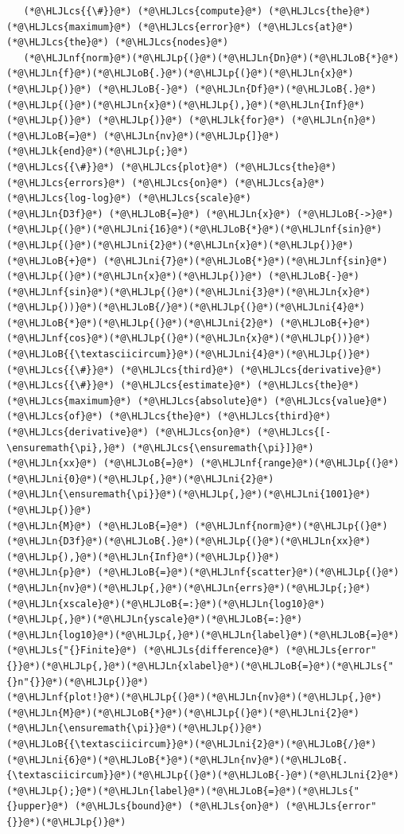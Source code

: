 \documentclass[12pt,a4paper]{article}
\newcommand{\HLJLk}[1]{\textcolor[RGB]{148,91,176}{\textbf{#1}}}
\newcommand{\HLJLn}[1]{#1}
\newcommand{\HLJLnf}[1]{\textcolor[RGB]{66,102,213}{#1}}
\newcommand{\HLJLs}[1]{\textcolor[RGB]{201,61,57}{#1}}
\newcommand{\HLJLni}[1]{\textcolor[RGB]{59,151,46}{#1}}
\newcommand{\HLJLoB}[1]{\textcolor[RGB]{102,102,102}{\textbf{#1}}}
\newcommand{\HLJLp}[1]{#1}
\newcommand{\HLJLcs}[1]{\textcolor[RGB]{153,153,119}{\textit{#1}}}
\begin{document}
\begin{lstlisting}
   (*@\HLJLcs{{\#}}@*) (*@\HLJLcs{compute}@*) (*@\HLJLcs{the}@*) (*@\HLJLcs{maximum}@*) (*@\HLJLcs{error}@*) (*@\HLJLcs{at}@*) (*@\HLJLcs{the}@*) (*@\HLJLcs{nodes}@*)
   (*@\HLJLnf{norm}@*)(*@\HLJLp{(}@*)(*@\HLJLn{Dn}@*)(*@\HLJLoB{*}@*)(*@\HLJLn{f}@*)(*@\HLJLoB{.}@*)(*@\HLJLp{(}@*)(*@\HLJLn{x}@*)(*@\HLJLp{)}@*) (*@\HLJLoB{-}@*) (*@\HLJLn{Df}@*)(*@\HLJLoB{.}@*)(*@\HLJLp{(}@*)(*@\HLJLn{x}@*)(*@\HLJLp{),}@*)(*@\HLJLn{Inf}@*)(*@\HLJLp{)}@*) (*@\HLJLp{)}@*) (*@\HLJLk{for}@*) (*@\HLJLn{n}@*) (*@\HLJLoB{=}@*) (*@\HLJLn{nv}@*)(*@\HLJLp{]}@*)
(*@\HLJLk{end}@*)(*@\HLJLp{;}@*)
(*@\HLJLcs{{\#}}@*) (*@\HLJLcs{plot}@*) (*@\HLJLcs{the}@*) (*@\HLJLcs{errors}@*) (*@\HLJLcs{on}@*) (*@\HLJLcs{a}@*) (*@\HLJLcs{log-log}@*) (*@\HLJLcs{scale}@*)
(*@\HLJLn{D3f}@*) (*@\HLJLoB{=}@*) (*@\HLJLn{x}@*) (*@\HLJLoB{->}@*) (*@\HLJLp{(}@*)(*@\HLJLni{16}@*)(*@\HLJLoB{*}@*)(*@\HLJLnf{sin}@*)(*@\HLJLp{(}@*)(*@\HLJLni{2}@*)(*@\HLJLn{x}@*)(*@\HLJLp{)}@*) (*@\HLJLoB{+}@*) (*@\HLJLni{7}@*)(*@\HLJLoB{*}@*)(*@\HLJLnf{sin}@*)(*@\HLJLp{(}@*)(*@\HLJLn{x}@*)(*@\HLJLp{)}@*) (*@\HLJLoB{-}@*) (*@\HLJLnf{sin}@*)(*@\HLJLp{(}@*)(*@\HLJLni{3}@*)(*@\HLJLn{x}@*)(*@\HLJLp{))}@*)(*@\HLJLoB{/}@*)(*@\HLJLp{(}@*)(*@\HLJLni{4}@*)(*@\HLJLoB{*}@*)(*@\HLJLp{(}@*)(*@\HLJLni{2}@*) (*@\HLJLoB{+}@*) (*@\HLJLnf{cos}@*)(*@\HLJLp{(}@*)(*@\HLJLn{x}@*)(*@\HLJLp{))}@*)(*@\HLJLoB{{\textasciicircum}}@*)(*@\HLJLni{4}@*)(*@\HLJLp{)}@*) (*@\HLJLcs{{\#}}@*) (*@\HLJLcs{third}@*) (*@\HLJLcs{derivative}@*)
(*@\HLJLcs{{\#}}@*) (*@\HLJLcs{estimate}@*) (*@\HLJLcs{the}@*) (*@\HLJLcs{maximum}@*) (*@\HLJLcs{absolute}@*) (*@\HLJLcs{value}@*) (*@\HLJLcs{of}@*) (*@\HLJLcs{the}@*) (*@\HLJLcs{third}@*) (*@\HLJLcs{derivative}@*) (*@\HLJLcs{on}@*) (*@\HLJLcs{[-\ensuremath{\pi},}@*) (*@\HLJLcs{\ensuremath{\pi}]}@*)
(*@\HLJLn{xx}@*) (*@\HLJLoB{=}@*) (*@\HLJLnf{range}@*)(*@\HLJLp{(}@*)(*@\HLJLni{0}@*)(*@\HLJLp{,}@*)(*@\HLJLni{2}@*)(*@\HLJLn{\ensuremath{\pi}}@*)(*@\HLJLp{,}@*)(*@\HLJLni{1001}@*)(*@\HLJLp{)}@*)
(*@\HLJLn{M}@*) (*@\HLJLoB{=}@*) (*@\HLJLnf{norm}@*)(*@\HLJLp{(}@*)(*@\HLJLn{D3f}@*)(*@\HLJLoB{.}@*)(*@\HLJLp{(}@*)(*@\HLJLn{xx}@*)(*@\HLJLp{),}@*)(*@\HLJLn{Inf}@*)(*@\HLJLp{)}@*)
(*@\HLJLn{p}@*) (*@\HLJLoB{=}@*)(*@\HLJLnf{scatter}@*)(*@\HLJLp{(}@*)(*@\HLJLn{nv}@*)(*@\HLJLp{,}@*)(*@\HLJLn{errs}@*)(*@\HLJLp{;}@*)(*@\HLJLn{xscale}@*)(*@\HLJLoB{=:}@*)(*@\HLJLn{log10}@*)(*@\HLJLp{,}@*)(*@\HLJLn{yscale}@*)(*@\HLJLoB{=:}@*)(*@\HLJLn{log10}@*)(*@\HLJLp{,}@*)(*@\HLJLn{label}@*)(*@\HLJLoB{=}@*)(*@\HLJLs{"{}Finite}@*) (*@\HLJLs{difference}@*) (*@\HLJLs{error"{}}@*)(*@\HLJLp{,}@*)(*@\HLJLn{xlabel}@*)(*@\HLJLoB{=}@*)(*@\HLJLs{"{}n"{}}@*)(*@\HLJLp{)}@*)
(*@\HLJLnf{plot!}@*)(*@\HLJLp{(}@*)(*@\HLJLn{nv}@*)(*@\HLJLp{,}@*)(*@\HLJLn{M}@*)(*@\HLJLoB{*}@*)(*@\HLJLp{(}@*)(*@\HLJLni{2}@*)(*@\HLJLn{\ensuremath{\pi}}@*)(*@\HLJLp{)}@*)(*@\HLJLoB{{\textasciicircum}}@*)(*@\HLJLni{2}@*)(*@\HLJLoB{/}@*)(*@\HLJLni{6}@*)(*@\HLJLoB{*}@*)(*@\HLJLn{nv}@*)(*@\HLJLoB{.{\textasciicircum}}@*)(*@\HLJLp{(}@*)(*@\HLJLoB{-}@*)(*@\HLJLni{2}@*)(*@\HLJLp{);}@*)(*@\HLJLn{label}@*)(*@\HLJLoB{=}@*)(*@\HLJLs{"{}upper}@*) (*@\HLJLs{bound}@*) (*@\HLJLs{on}@*) (*@\HLJLs{error"{}}@*)(*@\HLJLp{)}@*)
\end{lstlisting}
\end{document}
